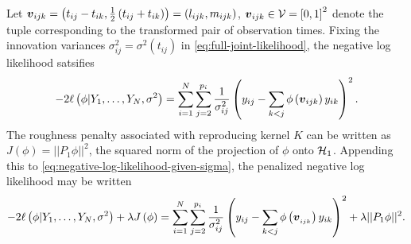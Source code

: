 \bigskip

Let $\mbox{\boldmath $v$}_{ijk} = \left(t_{ij} - t_{ik}, \frac{1}{2}\left(t_{ij} + t_{ik}\right)\right) = \left(l_{ijk}, m_{ijk}\right)$, $\mbox{\boldmath $v$}_{ijk} \in \mathcal{V} = \left[0,1\right]^2$ denote the tuple corresponding to the transformed pair of observation times. Fixing the innovation variances $\sigma_{ij}^2 = \sigma^2\left(t_{ij}\right)$ in \eqref{eq:full-joint-likelihood}, the negative log likelihood satsifies
\begin{equation}\label{eq:negative-log-likelihood-given-sigma}
-2\ell\left(\phi \vert Y_1,\dots, Y_N, \sigma^2\right) = \sum_{i=1}^N \sum_{j=2}^{p_i} \frac{1}{\sigma^{2}_{ij}}\left( y_{ij} - \sum_{k<j} \phi\left(\mbox{\boldmath $v$}_{ijk}\right) y_{ik}  \right)^2.
\end{equation}
\noindent
The roughness penalty associated with reproducing kernel $K$ can be written as $J\left(\phi\right) =\vert \vert P_1 \phi \vert\vert^2$, the squared norm of the projection of $\phi$ onto $\mathcal{H}_1$. Appending this to \eqref{eq:negative-log-likelihood-given-sigma}, the penalized negative log likelihood may be written
 \begin{equation} \label{eq:phi-penalized-sums-of-squares}
-2\ell\left(\phi \vert Y_1,\dots, Y_N, \sigma^2\right) + \lambda J\left(\phi\right) = \sum_{i=1}^N \sum_{j=2}^{p_i} \frac{1}{\sigma^{2}_{ij}}\left( y_{ij} - \sum_{k<j}\phi\left(\mbox{\boldmath $v$}_{_{ijk}}\right) y_{ik}  \right)^2 + \lambda \vert\vert P_1 \phi \vert \vert^2.
\end{equation} 


